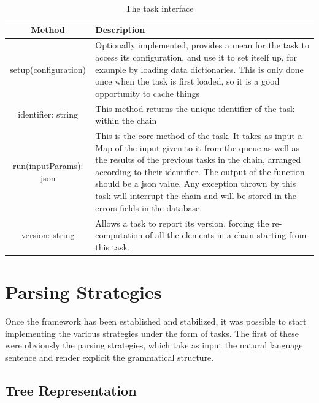 \begin{table}
  \caption{The task interface}
  \label{tab:task_interface}
  
  \begin{center}
    \begin{tabular}{c | p{10cm} }
      Method & Description\\
      \hline
      setup(configuration) & Optionally implemented, provides a mean for the task to access its configuration, and use it to set itself up, for example by loading data dictionaries. This is only done once when the task is first loaded, so it is a good opportunity to cache things\\
      identifier: string & This method returns the unique identifier of the task within the chain\\
      run(inputParams): json & This is the core method of the task. It takes as input a Map of the input given to it from the queue as well as the results of the previous tasks in the chain, arranged according to their identifier. The output of the function should be a json value. Any exception thrown by this task will interrupt the chain and will be stored in the errors fields in the database.\\
      version: string & Allows a task to report its version, forcing the re-computation of all the elements in a chain starting from this task.\\
    \end{tabular}
  \end{center}
\end{table}

\section{Parsing Strategies} %
\label{sec:parsing_strategies}

Once the framework has been established and stabilized, it was possible to start implementing the various strategies under the form of tasks. The first of these were obviously the parsing strategies, which take as input the natural language sentence and render explicit the grammatical structure.

\subsection{Tree Representation} %
\label{sub:tree_representation}


